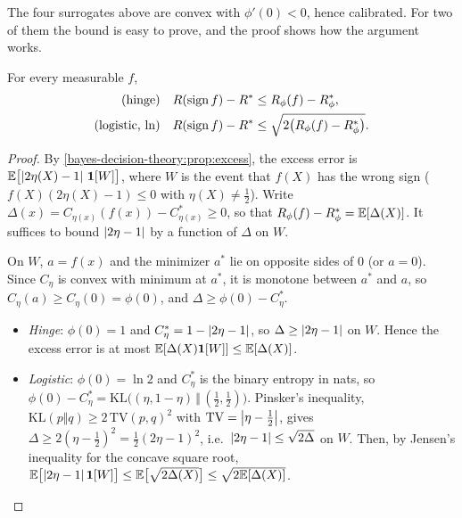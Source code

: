 \begin{notechapter}
The four surrogates above are convex with $\phi'(0)<0$, hence calibrated. For two of
them the bound is easy to prove, and the proof shows how the argument works.

\begin{proposition}\label{surrogate-losses:prop:bounds}
For every measurable $f$,
\begin{align*}
  \text{(hinge)}&\quad R(\operatorname{sign} f) - R^*\leq R_\phi(f) - R^*_\phi,\\
  \text{(logistic, $\ln$)}&\quad R(\operatorname{sign} f) - R^*\leq\sqrt{2\bigl(R_\phi(f) - R^*_\phi\bigr)}.
\end{align*}
\end{proposition}

\begin{proof}
By \cref{bayes-decision-theory:prop:excess}, the excess error is
$\mathbb{E}\bigl[\left|2\eta(X) - 1\right|\,\mathbf{1}[W]\bigr]$, where $W$ is the event that $f(X)$ has the wrong sign
($f(X)(2\eta(X) - 1)\leq0$ with $\eta(X)\neq\frac12$). Write $\Delta(x) = C_{\eta(x)}(f(x)) - C^*_{\eta(x)}\geq0$, so that
$R_\phi(f) - R^*_\phi = \mathbb{E}[\Delta(X)]$. It suffices to bound $\left|2\eta - 1\right|$ by a function of $\Delta$ on $W$.

On $W$, $a = f(x)$ and the minimizer $a^*$ lie on opposite sides of $0$ (or $a = 0$). Since $C_\eta$ is
convex with minimum at $a^*$, it is monotone between $a^*$ and $a$, so
$C_\eta(a)\geq C_\eta(0) = \phi(0)$, and $\Delta\geq\phi(0) - C^*_\eta$.
\begin{itemize}[nosep]
  \item \emph{Hinge}: $\phi(0) = 1$ and $C^*_\eta = 1 - \left|2\eta - 1\right|$, so $\Delta\geq\left|2\eta - 1\right|$ on $W$. Hence the
        excess error is at most $\mathbb{E}[\Delta(X)\mathbf{1}[W]]\leq\mathbb{E}[\Delta(X)]$.
  \item \emph{Logistic}: $\phi(0) = \ln2$ and $C^*_\eta$ is the binary entropy in nats, so
        $\phi(0) - C^*_\eta = \mathrm{KL}\bigl((\eta, 1 - \eta)\,\Vert\,(\frac12,\frac12)\bigr)$. Pinsker's inequality,
        $\mathrm{KL}(p\Vert q)\geq2\,\mathrm{TV}(p, q)^2$ with $\mathrm{TV} = \left|\eta - \frac12\right|$, gives
        $\Delta\geq2(\eta - \frac12)^2 = \frac12(2\eta - 1)^2$, i.e.\ $\left|2\eta - 1\right|\leq\sqrt{2\Delta}$ on $W$. Then, by Jensen's
        inequality for the concave square root,
        $\mathbb{E}\bigl[\left|2\eta - 1\right|\mathbf{1}[W]\bigr]\leq\mathbb{E}\bigl[\sqrt{2\Delta(X)}\bigr]\leq\sqrt{2\mathbb{E}[\Delta(X)]}$.\qedhere
\end{itemize}
\end{proof}


\end{notechapter}
